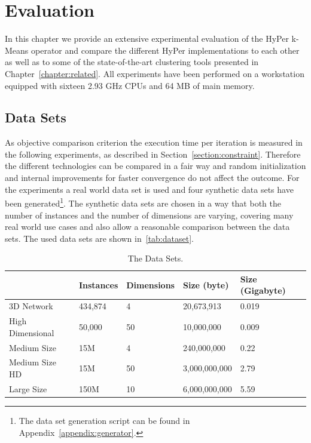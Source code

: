 \chapter{Evaluation}\label{chapter:evaluation}

In this chapter we provide an extensive experimental evaluation of the HyPer k-Means operator and compare the different HyPer implementations to each other as well as to some of the state-of-the-art clustering tools presented in Chapter~\ref{chapter:related}. All experiments have been performed on a workstation equipped with sixteen 2.93 GHz CPUs and 64 MB of main memory.


\section{Data Sets}
As objective comparison criterion the execution time per iteration is measured in the following experiments, as described in Section~\ref{section:constraint}. Therefore the different technologies can be compared in a fair way and random initialization and internal improvements for faster convergence do not affect the outcome. For the experiments a real world data set is used and four synthetic data sets have been generated\footnote{The data set generation script can be found in Appendix~\ref{appendix:generator}.}. The synthetic data sets are chosen in a way that both the number of instances and the number of dimensions are varying, covering many real world use cases and also allow a reasonable comparison between the data sets. The used data sets are shown in~\autoref{tab:dataset}.

\begin{table}[htsb]
  \caption[The Data Sets]{The Data Sets.}\label{tab:dataset}
  \centering
  \begin{tabular}{l l l l l}
    \toprule
      & Instances & Dimensions & Size (byte) & Size (Gigabyte) \\
    \midrule
      3D Network        & 434,874    & 4     & 20,673,913 & 0.019 \\
      High Dimensional  & 50,000     & 50    & 10,000,000 & 0.009 \\
      Medium Size       & 15M       & 4     & 240,000,000 & 0.22 \\
      Medium Size HD    & 15M       & 50    & 3,000,000,000 & 2.79 \\
      Large Size        & 150M      & 10    & 6,000,000,000 & 5.59 \\
    \bottomrule
  \end{tabular}
\end{table}



